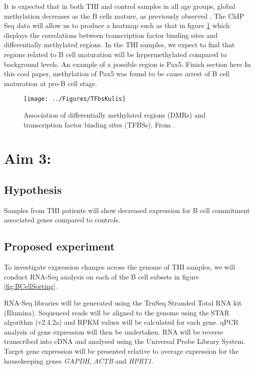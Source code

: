 \documentclass[12pt]{article}
\begin{document}
			It is expected that in both THI and control samples in all age groups, global methylation decreases as the B cells mature, as previously observed \citep{Kulis15,Lai13,Kulis12,Shaknovich11}. 
			The ChIP Seq data will allow us to produce a heatmap such as that in figure \ref{fig:TFBSheatmap} which displays the correlations between transcription factor binding sites and differentially methylated regions. 
			In the THI samples, we expect to find that regions related to B cell maturation will be hypermethylated compared to background levels. 
			An example of a possible region is Pax5. {\Huge Finish section here}
			In this cool paper, methylation of Pax5 was found to be cause arrest of B cell maturation at pro-B cell stage. 
			
			
			
			\begin{figure}[tb]
				\centering
				\texttt{[image: ../Figures/TFbsKulis]}
				\caption{Association of differentially methylated regions (DMRs) and transcription factor binding sites (TFBSs). From \citet{Kulis15}.}
				\label{fig:TFBSheatmap}
			\end{figure}
		
	\section{Aim 3:}
	
		\subsection{Hypothesis}
			
			Samples from THI patients will show decreased expression for B cell commitment associated genes compared to controls.
					
		\subsection{Proposed experiment}
			
			To investigate expression changes across the genome of THI samples, we will conduct RNA-Seq analysis on each of the B cell subsets in figure \ref{fig:BCellSorting}. 

			RNA-Seq libraries will be generated using the TruSeq Stranded Total RNA kit (Illumina). 
			Sequenced reads will be aligned to the genome using the STAR algorithm (v2.4.2a)\citep{Dobin13} and RPKM values will be calculated for each gene.
			qPCR analysis of gene expression will then be undertaken. 
			RNA will be reverse transcribed into cDNA and analysed using the Universal Probe Library System. 
			Target gene expression will be presented relative to average expression for the housekeeping genes \textit{GAPDH}, \textit{ACTB} and \textit{HPRT1}.
			
\end{document}
